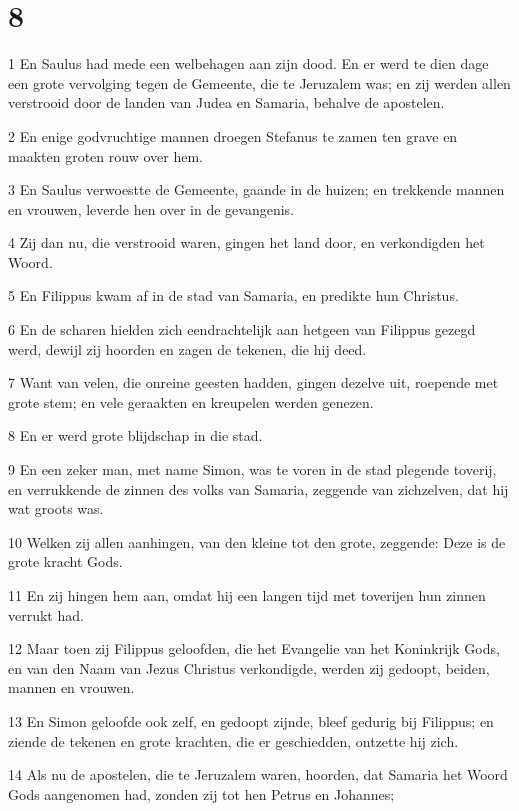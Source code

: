 \chapter{8}

\par 1 En Saulus had mede een welbehagen aan zijn dood. En er werd te dien dage een grote vervolging tegen de Gemeente, die te Jeruzalem was; en zij werden allen verstrooid door de landen van Judea en Samaria, behalve de apostelen.
\par 2 En enige godvruchtige mannen droegen Stefanus te zamen ten grave en maakten groten rouw over hem.
\par 3 En Saulus verwoestte de Gemeente, gaande in de huizen; en trekkende mannen en vrouwen, leverde hen over in de gevangenis.
\par 4 Zij dan nu, die verstrooid waren, gingen het land door, en verkondigden het Woord.
\par 5 En Filippus kwam af in de stad van Samaria, en predikte hun Christus.
\par 6 En de scharen hielden zich eendrachtelijk aan hetgeen van Filippus gezegd werd, dewijl zij hoorden en zagen de tekenen, die hij deed.
\par 7 Want van velen, die onreine geesten hadden, gingen dezelve uit, roepende met grote stem; en vele geraakten en kreupelen werden genezen.
\par 8 En er werd grote blijdschap in die stad.
\par 9 En een zeker man, met name Simon, was te voren in de stad plegende toverij, en verrukkende de zinnen des volks van Samaria, zeggende van zichzelven, dat hij wat groots was.
\par 10 Welken zij allen aanhingen, van den kleine tot den grote, zeggende: Deze is de grote kracht Gods.
\par 11 En zij hingen hem aan, omdat hij een langen tijd met toverijen hun zinnen verrukt had.
\par 12 Maar toen zij Filippus geloofden, die het Evangelie van het Koninkrijk Gods, en van den Naam van Jezus Christus verkondigde, werden zij gedoopt, beiden, mannen en vrouwen.
\par 13 En Simon geloofde ook zelf, en gedoopt zijnde, bleef gedurig bij Filippus; en ziende de tekenen en grote krachten, die er geschiedden, ontzette hij zich.
\par 14 Als nu de apostelen, die te Jeruzalem waren, hoorden, dat Samaria het Woord Gods aangenomen had, zonden zij tot hen Petrus en Johannes;
